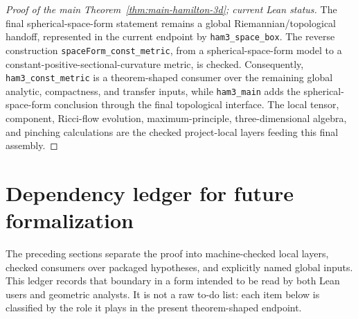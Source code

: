 \documentclass[11pt]{article}
\theoremstyle{plain}
\theoremstyle{definition}
\theoremstyle{remark}
\newcommand{\leanref}[1]{\nolinkurl{#1}}
\begin{document}
\begin{proof}[Proof of the main Theorem~\ref{thm:main-hamilton-3d}; current Lean status]
The final spherical-space-form statement remains a global Riemannian/topological
handoff, represented in the current endpoint by \leanref{ham3_space_box}.  The
reverse construction \leanref{spaceForm_const_metric}, from a spherical-space-form
model to a constant-positive-sectional-curvature metric, is checked.
Consequently, \leanref{ham3_const_metric} is a theorem-shaped consumer over the
remaining global analytic, compactness, and transfer inputs, while
\leanref{ham3_main} adds the spherical-space-form conclusion through the final
topological interface.  The local tensor, component, Ricci-flow evolution,
maximum-principle, three-dimensional algebra, and pinching calculations are the
checked project-local layers feeding this final assembly.
\end{proof}


\section{Dependency ledger for future formalization}

The preceding sections separate the proof into machine-checked local layers,
checked consumers over packaged hypotheses, and explicitly named global inputs.
This ledger records that boundary in a form intended to be read by both Lean
users and geometric analysts.  It is not a raw to-do list: each item below is
classified by the role it plays in the present theorem-shaped endpoint.
\end{document}
